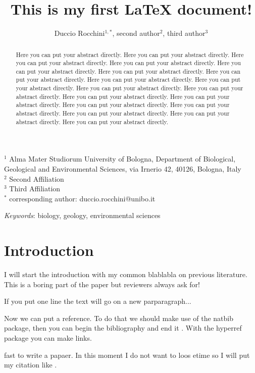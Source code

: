 \documentclass[a4paper,12pt]{article}
\title{This is my first LaTeX document!}
\author{Duccio Rocchini$^{1,*}$, second author$^2$, third author$^3$}
\begin{document}
\maketitle

\noindent
$^1$ Alma Mater Studiorum University of Bologna, Department of Biological, Geological and Environmental Sciences, via Irnerio 42, 40126, Bologna, Italy\\
$^2$ Second Affiliation \\
$^3$ Third Affiliation \\
$^*$ corresponding author: duccio.rocchini@unibo.it

\begin{abstract}
Here you can put your abstract directly. Here you can put your abstract directly. Here you can put your abstract directly. Here you can put your abstract directly. Here you can put your abstract directly. Here you can put your abstract directly. Here you can put your abstract directly. Here you can put your abstract directly. Here you can put your abstract directly. Here you can put your abstract directly. Here you can put your abstract directly. Here you can put your abstract directly. Here you can put your abstract directly. Here you can put your abstract directly. Here you can put your abstract directly. Here you can put your abstract directly. Here you can put your abstract directly. Here you can put your abstract directly. 
\end{abstract}

\bigskip
\textit{Keywords}: biology, geology, environmental sciences

\newpage
\section{Introduction}

I will start the introduction with my common blablabla on previous literature. This is a boring part of the paper but reviewers always ask for! 

If you put one line the text will go on a new parparagraph...

Now we can put a reference. To do that we should make use of the natbib package, then you can begin the bibliography and end it \citep{borcard}. With the hyperref package you can make links.

fast to write a papaer. In this moment I do not want to loos etime so I will put my citation like \citep{phelps}. 
\end{document}
